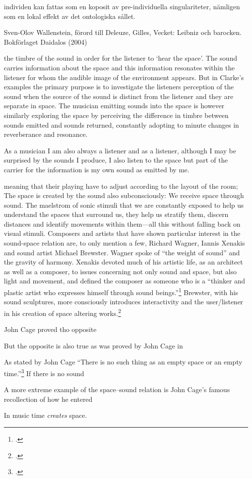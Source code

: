 individen kan fattas som en koposit av pre-individuella singulariteter, nämligen som en lokal effekt av det ontologiska sållet.

Sven-Olov Wallenstein, förord till Deleuze, Gilles, Vecket: Leibniz och barocken. Bokförlaget Daidalos (2004)


the timbre of the sound in order for the listener to `hear the space'. The sound carries information about the space and this information resonates within the listener for whom the audible image of the environment appears. But in Clarke's examples the primary purpose is to investigate the listeners perception of the sound when the source of the sound is distinct from the listener and they are separate in space. The musician emitting sounds into the space is however similarly exploring the space by perceiving the difference in timbre between sounds emitted and sounds returned, constantly adopting to minute changes in reverberance and resonance. 

As a musician I am also always a listener and as a listener, although I may be surprised by the sounds I produce, I also listen to the space but part of the carrier for the information is my own sound as emitted by me. 

 meaning that their playing have to adjust according to the layout of the room; The space is created by the sound also subconsciously: We receive space through sound. The maelstrom of sonic stimuli that we are constantly exposed to help us understand the spaces that surround us, they help us stratify them, discern distances and identify movements within them---all this without falling back on visual stimuli. Composers and artists that have shown particular interest in the sound-space relation are, to only mention a few, Richard Wagner, Iannis Xenakis and sound artist Michael Brewster. Wagner spoke of ``the weight of sound'' and the gravity of harmony. Xenakis devoted much of his artistic life, as an architect as well as a composer, to issues concerning not only sound and space, but also light and movement, and defined the composer as someone who is a ``thinker and plastic artist who expresses himself through sound beings.''\footcite[][255]{xenakis71} Brewster, with his sound sculptures, more consciously introduces interactivity and the user/listener in his creation of space altering works.\footcite[][Ch. 11]{labelle06}


John Cage proved tho opposite

But the opposite is also true as was proved by John Cage in 

As stated by John Cage ``There is no such thing as an empty space or an empty time.''\footcite[8]{cage61} If there is no sound 

A more extreme example of the space--sound relation is John Cage's famous recollection of how he entered 

In music time \emph{creates} space.

